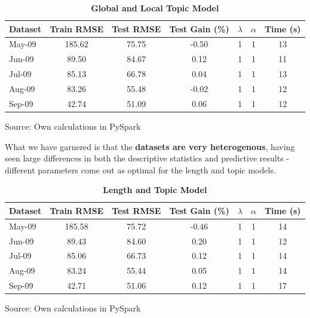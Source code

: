 \documentclass[11pt,preprint, authoryear]{article}
\numberwithin{equation}{section}
\begin{document}
\begin{longtable}[htbp] {@{} lcccccc @{}} 
\caption{\textbf{Global and Local Topic Model}} 
\label{tab:rand_topic_model} \\
\toprule
\textbf{Dataset} &  \textbf{Train RMSE} &  \textbf{Test RMSE} &  \textbf{Test Gain (\%)} & \textbf{$\lambda$} & \textbf{$\alpha$} &  \textbf{Time (s)} \\
\midrule
May-09 &            185.62 &          75.75 &           -0.50 &               1 &               1 &            13 \\
Jun-09 &             89.50 &          84.67 &            0.12 &               1 &               1 &            11 \\
Jul-09 &             85.13 &          66.78 &            0.04 &               1 &               1 &            13 \\
Aug-09 &             83.26 &          55.48 &           -0.02 &               1 &               1 &            12 \\
Sep-09 &             42.74 &          51.09 &            0.06 &               1 &               1 &            12 \\
\bottomrule
\end{longtable}\begin{center} Source: Own calculations in PySpark\end{center}

\normalsize

What we have garnered is that the \textbf{datasets are very
heterogenous}, having seen large differences in both the descriptive
statistics and predictive results - different parameters come out as
optimal for the length and topic models.

\footnotesize

\begin{longtable}[htbp] {@{} lcccccc @{}} 
\caption{\textbf{Length and Topic Model}} 
\label{tab:rand_final_model} \\
\toprule
\textbf{Dataset} &  \textbf{Train RMSE} &  \textbf{Test RMSE} &  \textbf{Test Gain (\%)} & \textbf{$\lambda$} & \textbf{$\alpha$} &  \textbf{Time (s)} \\
\midrule
May-09 &           185.58 &         75.72 &          -0.46 &              1 &              1 &           14 \\
Jun-09 &            89.43 &         84.60 &           0.20 &              1 &              1 &           12 \\
Jul-09 &            85.06 &         66.73 &           0.12 &              1 &              1 &           14 \\
Aug-09 &            83.24 &         55.44 &           0.05 &              1 &              1 &           14 \\
Sep-09 &            42.71 &         51.06 &           0.12 &              1 &              1 &           17 \\
\bottomrule
\end{longtable}\begin{center} Source: Own calculations in PySpark\end{center}
\end{document}
